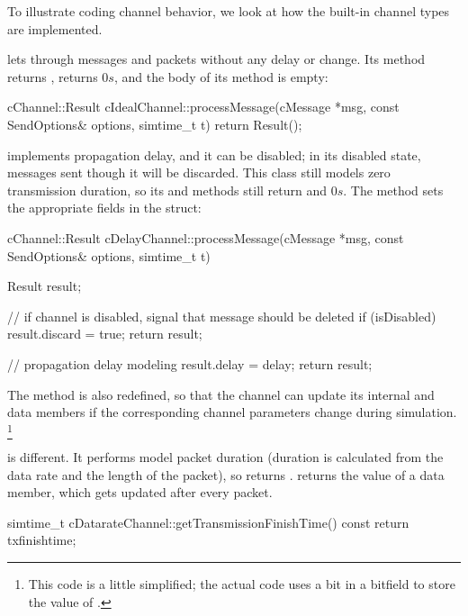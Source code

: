 To illustrate coding channel behavior, we look at how the built-in channel
types are implemented.

 lets through messages and packets without
any delay or change. Its  method returns
,  returns $0s$, and the
body of its  method is empty:

\begin{cpp}
cChannel::Result cIdealChannel::processMessage(cMessage *msg,
                    const SendOptions& options, simtime_t t)
{
    return Result();
}
\end{cpp}

 implements propagation delay, and it can be
disabled; in its disabled state, messages sent though it will be discarded.
This class still models zero transmission duration, so its
 and 
methods still return  and $0s$. The  method
sets the appropriate fields in the  struct:


\begin{cpp}
cChannel::Result cDelayChannel::processMessage(cMessage *msg,
                    const SendOptions& options, simtime_t t)
{
    Result result;

    // if channel is disabled, signal that message should be deleted
    if (isDisabled) {
        result.discard = true;
        return result;
    }

    // propagation delay modeling
    result.delay = delay;
    return result;
}
\end{cpp}

The  method is also redefined, so that
the channel can update its internal  and 
data members if the corresponding channel parameters change during simulation.
\footnote{This code is a little simplified; the actual code uses a bit
in a bitfield to store the value of .}

 is different. It performs model packet duration
(duration is calculated from the data rate and the length of the packet),
so  returns .
 returns the value of a 
data member, which gets updated after every packet.

\begin{cpp}
simtime_t cDatarateChannel::getTransmissionFinishTime() const
{
    return txfinishtime;
}
\end{cpp}

